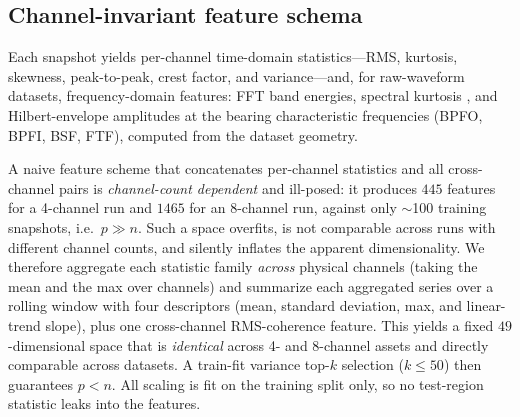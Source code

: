 \documentclass[journal]{IEEEtran}
\begin{document}
\subsection{Channel-invariant feature schema}
Each snapshot yields per-channel time-domain statistics---RMS, kurtosis,
skewness, peak-to-peak, crest factor, and variance---and, for raw-waveform
datasets, frequency-domain features: FFT band energies, spectral kurtosis
\cite{antoni2006}, and Hilbert-envelope amplitudes at the bearing
characteristic frequencies (BPFO, BPFI, BSF, FTF), computed from the dataset
geometry.

A naive feature scheme that concatenates per-channel statistics and all
cross-channel pairs is \emph{channel-count dependent} and ill-posed: it produces
$445$ features for a 4-channel run and $1465$ for an 8-channel run, against only
$\sim$100 training snapshots, i.e.\ $p \gg n$. Such a space overfits, is not
comparable across runs with different channel counts, and silently inflates the
apparent dimensionality. We therefore aggregate each statistic family
\emph{across} physical channels (taking the mean and the max over channels) and
summarize each aggregated series over a rolling window with four descriptors
(mean, standard deviation, max, and linear-trend slope), plus one cross-channel
RMS-coherence feature. This yields a fixed $49$-dimensional space that is
\emph{identical} across 4- and 8-channel assets and directly comparable across
datasets. A train-fit variance top-$k$ selection ($k\!\le\!50$) then guarantees
$p<n$. All scaling is fit on the training split only, so no test-region
statistic leaks into the features.
\end{document}
